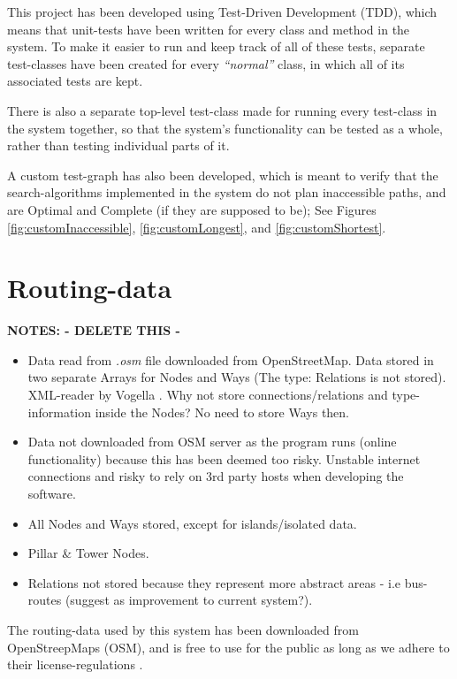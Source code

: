 This project has been developed using Test-Driven Development (TDD), which means that unit-tests have been written for every class and method in the system.
To make it easier to run and keep track of all of these tests, separate test-classes have been created for every \textit{\textquotedblleft normal\textquotedblright} class, in which all of its associated tests are kept.

There is also a separate top-level test-class made for running every test-class in the system together, so that the system's functionality can be tested as a whole, rather than testing individual parts of it.

A custom test-graph has also been developed, which is meant to verify that the search-algorithms implemented in the system do not plan inaccessible paths, and are Optimal and Complete (if they are supposed to be); See Figures \ref{fig:customInaccessible}, \ref{fig:customLongest}, and \ref{fig:customShortest}.

\section{Routing-data}
\textbf{NOTES: - DELETE THIS -}
\begin{itemize}
	\item Data read from \textit{.osm} file downloaded from OpenStreetMap\cite{OSM}. Data stored in two separate Arrays for Nodes and Ways (The type: Relations is not stored). XML-reader by Vogella \cite{Vogella-XML}.
	\subitem Why not store connections/relations and type-information inside the Nodes? No need to store Ways then.
	\item Data not downloaded from OSM server as the program runs (online functionality) because this has been deemed too risky. Unstable internet connections and risky to rely on 3rd party hosts when developing the software.
	\item All Nodes and Ways stored, except for islands/isolated data.
	\item Pillar \& Tower Nodes.
	\item Relations not stored because they represent more abstract areas - i.e bus-routes (suggest as improvement to current system?).
\end{itemize}

The routing-data used by this system has been downloaded from OpenStreepMaps (OSM)\cite{OSM}, and is free to use for the public as long as we adhere to their license-regulations \cite{OSMLicense}.

